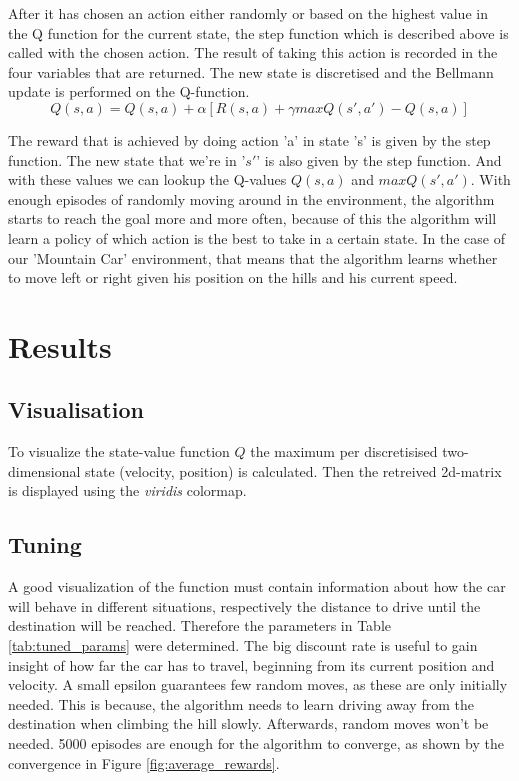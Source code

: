 \documentclass{article}
\begin{document}
After it has chosen an action either randomly or based on the highest value in the Q function for the current state, the step function which is described above is called with the chosen action. The result of taking this action is recorded in the four variables that are returned. The new state is discretised and the Bellmann update is performed on the Q-function. 
\begin{displaymath}
  Q(s, a) = Q(s,a) + \alpha[R(s,a) + \gamma max Q(s', a') - Q(s, a)]
\end{displaymath}

The reward that is achieved by doing action 'a' in state 's' is given by the step function. The new state that we're in '$s'$' is also given by the step function. And with these values we can lookup the Q-values $Q(s, a)$ and $max Q(s', a')$. 
With enough episodes of randomly moving around in the environment, the algorithm starts to reach the goal more and more often, because of this the algorithm will learn a policy of which action is the best to take in a certain state. In the case of our 'Mountain Car' environment, that means that the algorithm learns whether to move left or right given his position on the hills and his current speed.


\section{Results}

\subsection{Visualisation}
To visualize the state-value function $Q$ the maximum per discretisised two-dimensional state (velocity, position) is calculated. Then the retreived 2d-matrix is displayed using the \textit{viridis} colormap.

\subsection{Tuning}
A good visualization of the function must contain information about how the car will behave in different situations, respectively the distance to drive until the destination will be reached. Therefore the parameters in Table \ref{tab:tuned_params} were determined. The big discount rate is useful to gain insight of how far the car has to travel, beginning from its current position and velocity. A small epsilon guarantees few random moves, as these are only initially needed. This is because, the algorithm needs to learn driving away from the destination when climbing the hill slowly. Afterwards, random moves won't be needed. 5000 episodes are enough for the algorithm to converge, as shown by the convergence in Figure \ref{fig:average_rewards}.
\end{document}
